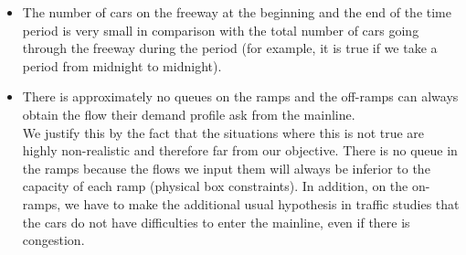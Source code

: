 \begin{itemize}
	\item The number of cars on the freeway at the beginning and the end of the time period is very small in comparison with the total number of cars going through the freeway during the period (for example, it is true if we take a period from midnight to midnight).
	\item There is approximately no queues on the ramps and the off-ramps can always obtain the flow their demand profile ask from the mainline.\\
	 We justify this by the fact that the situations where this is not true are highly non-realistic and therefore far from our objective. There is no queue in the ramps because the flows we input them will always be inferior to the capacity of each ramp (physical box constraints). In addition, on the on-ramps, we have to make the additional usual hypothesis in traffic studies that the cars do not have difficulties to enter the mainline, even if there is congestion.
\end{itemize}
